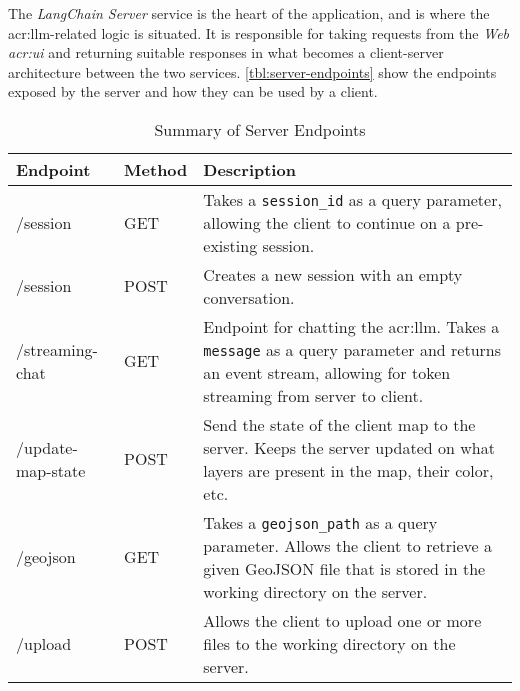 The \textit{LangChain Server} service is the heart of the application, and is where the \gls{acr:llm}-related logic is situated. It is responsible for taking requests from the \textit{Web \acrshort{acr:ui}} and returning suitable responses in what becomes a client-server architecture between the two services. \autoref{tbl:server-endpoints} show the endpoints exposed by the server and how they can be used by a client.

\begin{table}[h]
    \centering
    \caption{Summary of Server Endpoints}
    \label{tbl:server-endpoints}
    \begin{tabular}{p{}p{}p{}}
        \toprule
        \textbf{Endpoint} & \textbf{Method} & \textbf{Description}                                                                                                                                                         \\
        \midrule
        /session          & GET             & Takes a \texttt{session\_id} as a query parameter, allowing the client to continue on a pre-existing session.                                                                \\
        /session          & POST            & Creates a new session with an empty conversation.                                                                                                                            \\
        /streaming-chat   & GET             & Endpoint for chatting the \acrshort{acr:llm}. Takes a \texttt{message} as a query parameter and returns an event stream, allowing for token streaming from server to client. \\
        /update-map-state & POST            & Send the state of the client map to the server. Keeps the server updated on what layers are present in the map, their color, etc.                                            \\
        /geojson          & GET             & Takes a \texttt{geojson\_path} as a query parameter. Allows the client to retrieve a given GeoJSON file that is stored in the working directory on the server.               \\
        /upload           & POST            & Allows the client to upload one or more files to the working directory on the server.                                                                                        \\
        \bottomrule
    \end{tabular}
\end{table}

